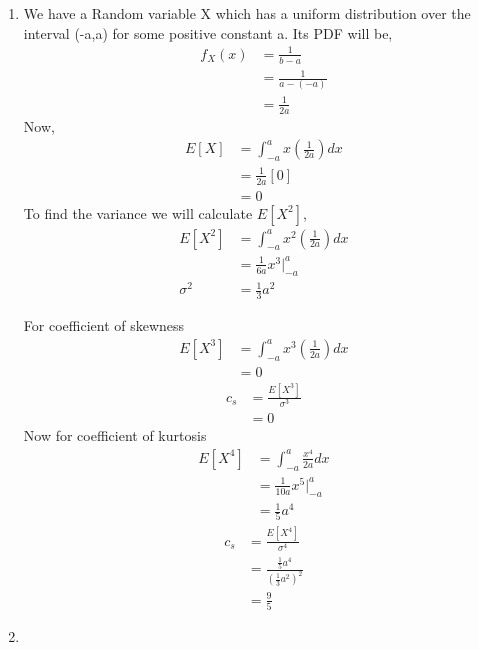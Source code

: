 \documentclass{article}
\begin{document}
\begin{enumerate}
  \newpage
\item
  We have a Random variable X which has a uniform distribution over the interval (-a,a) for some positive constant a. Its PDF will be,
  \begin{align*}
    f_{X}(x)&=\frac{1}{b-a}\\
    &=\frac{1}{a-(-a)}\\
    &=\frac{1}{2a}
  \end{align*}
  Now,
  \begin{align*}
    E[X]&=\int_{-a}^{a} x \left( \frac{1}{2a} \right) dx\\
    &=\frac{1}{2a}[0]\\
    &=0
  \end{align*}
  To find the variance we will calculate $E[X^2]$,
  \begin{align*}
    E[X^2]&=\int_{-a}^{a} x^2 \left( \frac{1}{2a} \right) dx\\
    &=\frac{1}{6a}x^3\Big|_{-a}^{a} \\
    \sigma^2 &=\frac{1}{3}a^2
  \end{align*}



  For coefficient of skewness
  \begin{align*}
    E[X^3] &=\int_{-a}^{a} x^3 \left( \frac{1}{2a} \right) dx \\
    &=0
  \end{align*}
  \begin{align*}
    c_{s}&=\frac{E[X^3]}{\sigma^3}\\
    &=0
  \end{align*}
  Now for coefficient of kurtosis
  \begin{align*}
    E[X^4]&=\int_{-a}^{a}\frac{x^4}{2a}dx\\
    &=\frac{1}{10a}x^5\Big|_{-a}^{a} \\
    &=\frac{1}{5}a^4
  \end{align*}
  \begin{align*}
    c_{s}&=\frac{E[X^4]}{\sigma^4}\\
    &=\frac{\frac{1}{5}a^4}{ \left( \frac{1}{3}a^2 \right)^2 }\\
    &=\frac{9}{5}
  \end{align*}

  \vspace{2mm}
  \newpage
\item


\end{enumerate}
\end{document}
